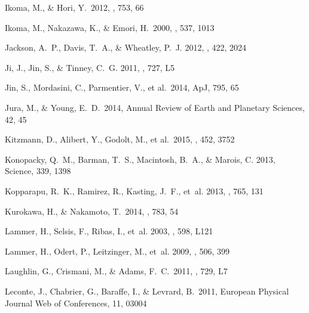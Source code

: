 \documentclass[]{emulateapj}
\begin{document}
\begin{thebibliography}{}
 Ikoma, M., \& Hori, Y.\ 2012, \apj, 753, 66 

 Ikoma, M., Nakazawa, K., \& Emori, H.\ 2000, \apj, 537, 1013 


{Jackson}, A.~P., {Davis}, T.~A., \& {Wheatley}, P.~J. 2012, \mnras, 422, 2024

{Ji}, J., {Jin}, S., \& {Tinney}, C.~G. 2011, \apjl, 727, L5

 Jin, S., Mordasini, C., 
  Parmentier, V., et al.\ 2014, ApJ, 795, 65
  
   Jura, M., \& Young, E.~D.\ 2014, Annual Review of Earth and Planetary Sciences, 42, 45 
  
 Kitzmann, D., Alibert, Y., Godolt, M., et al.\ 2015, \mnras, 452, 3752 

{Konopacky}, Q.~M., {Barman}, T.~S., {Macintosh}, B.~A., \& {Marois}, C. 2013,
  Science, 339, 1398

{Kopparapu}, R.~K., {Ramirez}, R., {Kasting}, J.~F., {et~al.} 2013, \apj, 765,
  131
  
 Kurokawa, H., \& Nakamoto, T.\ 2014, \apj, 783, 54 

{Lammer}, H., {Selsis}, F., {Ribas}, I., {et~al.} 2003, \apjl, 598, L121

{Lammer}, H., {Odert}, P., {Leitzinger}, M., {et~al.} 2009, \aap, 506, 399


 Laughlin, G., Crismani, M., \& Adams, F.~C.\ 2011, \apjl, 729, L7 

 Leconte, J., Chabrier, G., Baraffe, I., \& Levrard, B.\ 2011, European Physical Journal Web of Conferences, 11, 03004 


\end{thebibliography}
\end{document}
